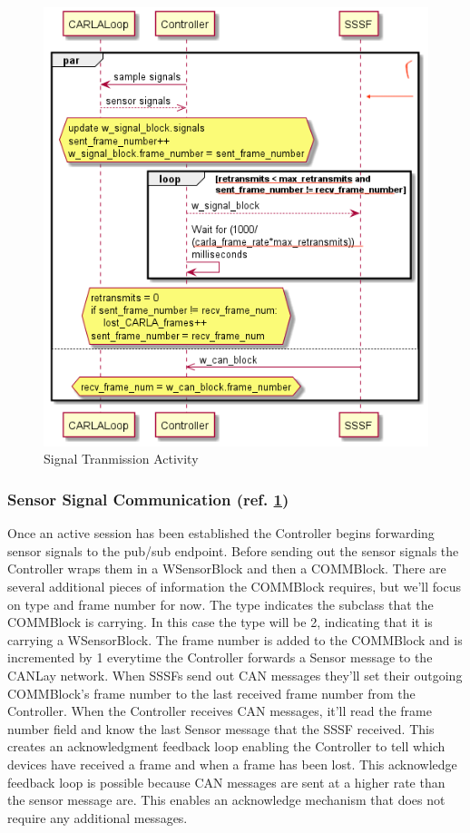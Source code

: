 \documentclass[letterpaper,twocolumn,12pt]{article}
\begin{document}
\begin{figure}[]
    \centering
    \includegraphics[width=\linewidth]{out/images/signal_control/signal_control.png}
    \caption{Signal Tranmission Activity}
    \label{fig:sig_x}
\end{figure}
\subsubsection{Sensor Signal Communication (ref. \ref{fig:sig_x})} \label{sec:sig_x}


Once an active session has been established the Controller begins forwarding sensor signals to the pub/sub endpoint. Before sending out the sensor signals the Controller wraps them in a WSensorBlock and then a COMMBlock. There are several additional pieces of information the COMMBlock requires, but we'll focus on type and frame number for now. The type indicates the subclass that the COMMBlock is carrying. In this case the type will be 2, indicating that it is carrying a WSensorBlock. The frame number is added to the COMMBlock and is incremented by 1 everytime the Controller forwards a Sensor message to the CANLay network. When SSSFs send out CAN messages they’ll set their outgoing COMMBlock's frame number to the last received frame number from the Controller. When the Controller receives CAN messages, it'll read the frame number field and know the last Sensor message that the SSSF received. This creates an acknowledgment feedback loop enabling the Controller to tell which devices have received a frame and when a frame has been lost. This acknowledge feedback loop is possible because CAN messages are sent at a higher rate than the sensor message are. This enables an acknowledge mechanism that does not require any additional messages.
\end{document}
